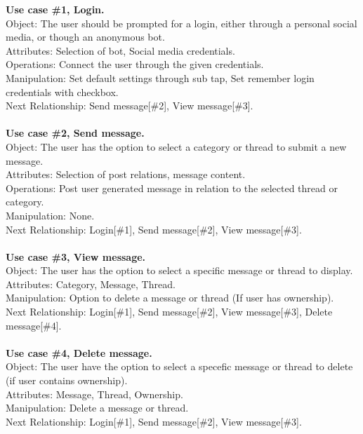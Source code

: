 \textbf{Use case \#1, Login.}\\
Object: The user should be prompted for a login, either through a personal social media, or though an anonymous bot.\\
Attributes: Selection of bot, Social media credentials.\\
Operations: Connect the user through the given credentials.\\
Manipulation: Set default settings through sub tap,  Set remember login credentials with checkbox.\\
Next Relationship: Send message[\#2], View message[\#3].\\\\
\newpage
\noindent
\textbf{Use case \#2, Send message.}\\
Object: The user has the option to select a category or thread to submit a new message.\\
Attributes: Selection of post relations, message content.\\
Operations: Post user generated message in relation to the selected thread or category.\\
Manipulation: None.\\
Next Relationship: Login[\#1], Send message[\#2], View message[\#3].\\\\
\noindent
\textbf{Use case \#3, View message.}\\
Object: The user has the option to select a specific message or thread to display.\\
Attributes: Category, Message, Thread.\\
Manipulation: Option to delete a message or thread (If user has ownership).\\
Next Relationship: Login[\#1], Send message[\#2], View message[\#3], Delete message[\#4].\\\\
\noindent
\textbf{Use case \#4, Delete message.}\\
Object: The user have the option to select a specefic message or thread to delete (if user contains ownership).\\
Attributes: Message, Thread, Ownership.\\
Manipulation: Delete a message or thread.\\
Next Relationship: Login[\#1], Send message[\#2], View message[\#3].\\